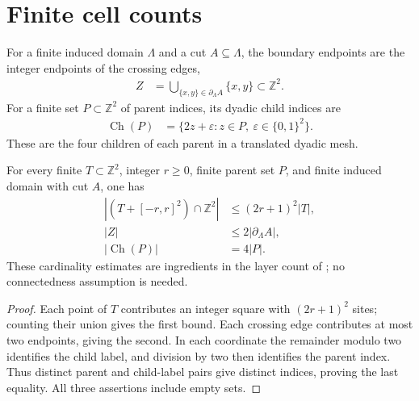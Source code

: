 \section{Finite cell counts}
\label{sec:area_law_finite_cell_counts}

\begin{definition}
    \label{def:area_law_cell_counts}
    \leanok
    For a finite induced domain $\Lambda$ and a cut $A\subseteq\Lambda$, the
    boundary endpoints are the integer endpoints of the crossing edges,
    \begin{align}
        Z & =\bigcup_{\{x,y\}\in\partial_\Lambda A}\{x,y\}\subset\mathbb Z^2.
        \label{eq:area_law_boundary_endpoints}
    \end{align}
    For a finite set $P\subset\mathbb Z^2$ of parent indices, its dyadic child
    indices are
    \begin{align}
        \operatorname{Ch}(P) & =
        \{2z+\varepsilon:z\in P,\ \varepsilon\in\{0,1\}^2\}.
        \label{eq:area_law_dyadic_children}
    \end{align}
    These are the four children of each parent in a translated dyadic mesh.
\end{definition}

\begin{lemma}
    \label{thm:area_law_cell_counts}
    \leanok
    For every finite $T\subset\mathbb Z^2$, integer $r\ge0$, finite parent
    set $P$, and finite induced domain with cut $A$, one has
    \begin{align}
        |(T+[-r,r]^2)\cap\mathbb Z^2| & \le(2r+1)^2|T|,
        \label{eq:area_law_dilation_count}                        \\
        |Z|                           & \le2|\partial_\Lambda A|,
        \label{eq:area_law_endpoint_count}                        \\
        |\operatorname{Ch}(P)|        & =4|P|.
        \label{eq:area_law_children_count}
    \end{align}
    These cardinality estimates are ingredients in the layer count of
    \cite[Section~11]{OpenAI2026AreaLaw}; no connectedness assumption is needed.
\end{lemma}
\begin{proof}\leanok
    Each point of $T$ contributes an integer square with $(2r+1)^2$ sites;
    counting their union gives the first bound. Each crossing edge contributes
    at most two endpoints, giving the second. In each coordinate the remainder
    modulo two identifies the child label, and division by two then identifies
    the parent index. Thus distinct parent and child-label pairs give distinct
    indices, proving the last equality. All three assertions include empty sets.
\end{proof}
